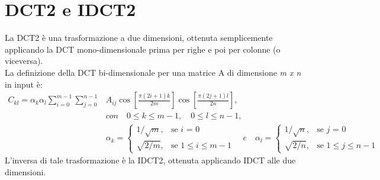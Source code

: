 \documentclass[a4paper,12pt]{report}
\begin{document}
\section{DCT2 e IDCT2}
La DCT2 è una trasformazione a due dimensioni, ottenuta semplicemente applicando la DCT mono-dimensionale prima per righe e poi per colonne (o viceversa).\\
La definizione della DCT bi-dimensionale per una matrice A di dimensione \textit{m x n} in input è:\\
\begin{align*}
C_{kl} = \alpha_k \alpha_l \sum_{i=0}^{m-1} \sum_{j=0}^{n-1}&A_{ij} \cos \left[\frac{\pi \left(2i + 1\right) k }{2m}\right] \cos \left[\frac{\pi \left(2j + 1\right) l }{2n}\right],\\
&con \quad 0 \leq k \leq m - 1, \quad 0 \leq l \leq n - 1,\\
&\alpha_k = \begin{cases} 1/\sqrt{m}, & \mbox{se } i\mbox{ = 0} \\ \sqrt{2/m}, & \mbox{se } \mbox{\(1 \leq i \leq m - 1\)} \end{cases} \quad e \quad \alpha_l = \begin{cases} 1/\sqrt{n}, & \mbox{se } j\mbox{ = 0} \\ \sqrt{2/n}, & \mbox{se } \mbox{\(1 \leq j \leq n - 1\)} \end{cases}
\end{align*}
L'inversa di tale trasformazione è la IDCT2, ottenuta applicando IDCT alle due dimensioni.
\end{document}
